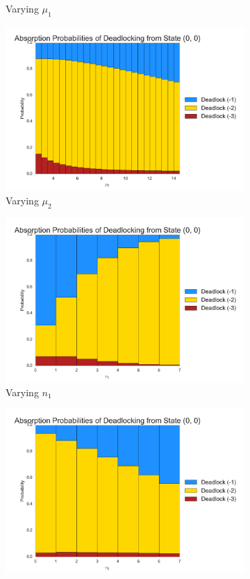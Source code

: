 \documentclass{article}
\begin{document}
\begin{figure}[!htbp]
\begin{subfigure}[b]{0.5\textwidth}
  \caption{Varying $\mu_1$}
  \label{fig:absprobmu1}
\end{subfigure}
\begin{subfigure}[b]{0.5\textwidth}
  \includegraphics[width=\textwidth]{images/absprobmu2}
  \caption{Varying $\mu_2$}
  \label{fig:absprobmu2}
\end{subfigure}
\begin{subfigure}[b]{0.5\textwidth}
  \includegraphics[width=\textwidth]{images/absprobn1}
  \caption{Varying $n_1$}
  \label{fig:absprobn1}
\end{subfigure}
\begin{subfigure}[b]{0.5\textwidth}
  \includegraphics[width=\textwidth]{images/absprobn2}

\end{subfigure}
\end{figure}
\end{document}
